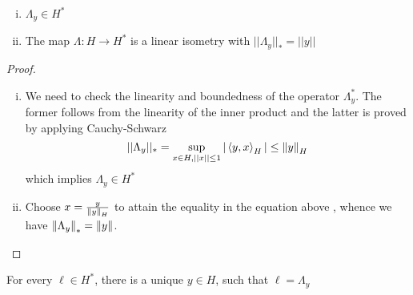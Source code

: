 \documentclass{article}
\begin{document}
\begin{lemma}
	\hfill
	\begin{enumerate}[i)]
		\item  \(\Lambda_y \in H^*\)
		\item The map  \(\Lambda: H \to H^*\) is a linear isometry with  \(||\Lambda_y||_{*}=||y||\)
	\end{enumerate}
\end{lemma}

\begin{proof}
	\begin{enumerate}[i)]
		\item We need to check the linearity and boundedness of the operator  \(\Lambda_y^*\). The former follows from the linearity of the inner product and the latter is proved by applying Cauchy-Schwarz
		      \begin{equation*}
			      ||\Lambda_y||_* = \sup_{x\in H, ||x|| \leq 1} |\left<{y},{x}\right>_H| \leq \left\|{y}\right\|_H
		      \end{equation*}
		      which implies  \(\Lambda_y \in H^*\)

		\item Choose  \(x = \frac{y}{\left\|{y}\right\|_H}\) to attain the equality in the equation above , whence we have  \(\left\|{\Lambda_y}\right\|_*=\left\|{y}\right\|\).
	\end{enumerate}
\end{proof}

\begin{theorem}
	 \nl
	\label{riesz representation}
	For every  \(\ell \in H^*\), there is a unique  \(y \in H\), such that  \(\ell=\Lambda_y\)
\end{theorem}
\end{document}
